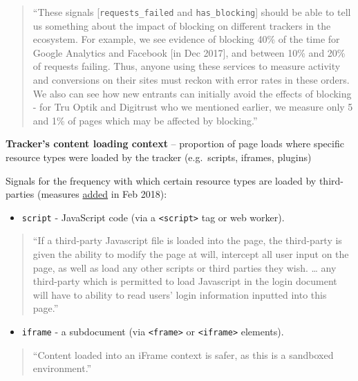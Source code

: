 \documentclass[
]{article}
\providecommand{\tightlist}{%
  \setlength{\itemsep}{0pt}\setlength{\parskip}{0pt}}
\begin{document}
\begin{quote}
``These signals {[}\texttt{requests\_failed} and
\texttt{has\_blocking}{]} should be able to tell us something about the
impact of blocking on different trackers in the ecosystem. For example,
we see evidence of blocking 40\% of the time for Google Analytics and
Facebook {[}in Dec 2017{]}, and between 10\% and 20\% of requests
failing. Thus, anyone using these services to measure activity and
conversions on their sites must reckon with error rates in these orders.
We also can see how new entrants can initially avoid the effects of
blocking - for Tru Optik and Digitrust who we mentioned earlier, we
measure only 5 and 1\% of pages which may be affected by blocking.''
\end{quote}

\newpage

\textbf{Tracker's content loading context} -- proportion of page loads
where specific resource types were loaded by the tracker (e.g.~scripts,
iframes, plugins)

Signals for the frequency with which certain resource types are loaded
by third-parties (measures \href{https://t.ly/NQcD}{added} in Feb 2018):

\begin{itemize}
\tightlist
\item
  \texttt{script} - JavaScript code (via a
  \texttt{\textless{}script\textgreater{}} tag or web worker).
\end{itemize}

\begin{quote}
``If a third-party Javascript file is loaded into the page, the
third-party is given the ability to modify the page at will, intercept
all user input on the page, as well as load any other scripts or third
parties they wish. \ldots{} any third-party which is permitted to load
Javascript in the login document will have to ability to read users'
login information inputted into this page.''
\end{quote}

\begin{itemize}
\tightlist
\item
  \texttt{iframe} - a subdocument (via
  \texttt{\textless{}frame\textgreater{}} or
  \texttt{\textless{}iframe\textgreater{}} elements).
\end{itemize}

\begin{quote}
``Content loaded into an iFrame context is safer, as this is a sandboxed
environment.''
\end{quote}
\end{document}
